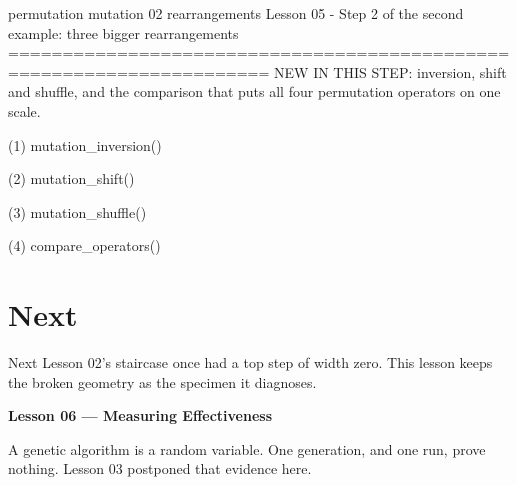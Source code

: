 \begin{frame}{permutation mutation 02 rearrangements}
Lesson 05 - Step 2 of the second example: three bigger rearrangements
======================================================================
NEW IN THIS STEP: inversion, shift and shuffle, and the comparison that puts
all four permutation operators on one scale.
\end{frame}

\begin{frame}[fragile]{(1) mutation\_inversion()}

\end{frame}

\begin{frame}[fragile]{(2) mutation\_shift()}

\end{frame}

\begin{frame}[fragile]{(3) mutation\_shuffle()}

\end{frame}

\begin{frame}[fragile]{(4) compare\_operators()}

\end{frame}


\section{Next}

\begin{frame}{Next}
Lesson 02's staircase once had a top step of width zero. This lesson keeps the broken geometry as the specimen it diagnoses.

\vspace{0.8em}
\textbf{Lesson 06 --- Measuring Effectiveness}

A genetic algorithm is a random variable. One generation, and one run, prove nothing. Lesson 03 postponed that evidence here.
\end{frame}

